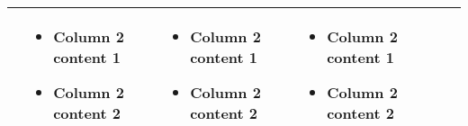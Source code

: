 \documentclass[landscape,a4paper]{article}
\begin{document}
\begin{table}[htpb]
\begin{tabular}{|c|p{}|p{}|p{}|p{}|p{}|}
        &
        \begin{itemize}[leftmargin=2mm]
            \item Column 2 content 1
            \item Column 2 content 2
        \end{itemize}
        &
        \begin{itemize}[leftmargin=2mm]
            \item Column 2 content 1
            \item Column 2 content 2
        \end{itemize}
        &
        \begin{itemize}[leftmargin=2mm]
            \item Column 2 content 1
            \item Column 2 content 2
        \end{itemize}

    \\ \hline
    \end{tabular}

\end{table}







\end{document}
